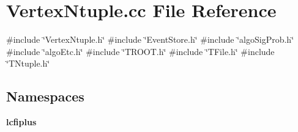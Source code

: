 \section{Vertex\+Ntuple.\+cc File Reference}
\label{VertexNtuple_8cc}
{\ttfamily \#include \char`\"{}Vertex\+Ntuple.\+h\char`\"{}}\newline
{\ttfamily \#include \char`\"{}Event\+Store.\+h\char`\"{}}\newline
{\ttfamily \#include \char`\"{}algo\+Sig\+Prob.\+h\char`\"{}}\newline
{\ttfamily \#include \char`\"{}algo\+Etc.\+h\char`\"{}}\newline
{\ttfamily \#include \char`\"{}T\+R\+O\+O\+T.\+h\char`\"{}}\newline
{\ttfamily \#include \char`\"{}T\+File.\+h\char`\"{}}\newline
{\ttfamily \#include \char`\"{}T\+Ntuple.\+h\char`\"{}}\newline
\subsection*{Namespaces}
\begin{DoxyCompactItemize}
\item 
 \textbf{ lcfiplus}
\end{DoxyCompactItemize}
